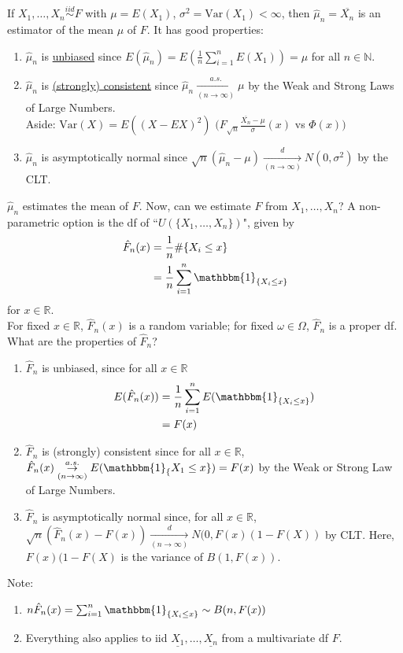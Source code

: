 \documentclass{article}
\newcommand{\R}{\mathbb{R}}
\newcommand{\N}{\mathbb{N}}
\newcommand{\Var}{\mathrm{Var}}
\begin{document}
			If $X_1, \dots, X_n\stackrel{iid}{\sim}F$ with $\mu=E(X_1)$, $\sigma^2=\Var(X_1)<\infty$, then $\hat{\mu}_n=\overline{X_n}$ is an estimator of the mean $\mu$ of $F$. It has good properties:
			
			\begin{enumerate}[label=(\roman*)]
				\item $\hat{\mu}_n$ is \ul{unbiased} since $E(\hat{\mu}_n)=E(\frac{1}{n}\sum_{i=1}^nE(X_1))=\mu$ for all $n\in\N$.
				
				\item $\hat{\mu}_n$ is \ul{(strongly) consistent} since $\hat{\mu}_n\underset{(n\to\infty)}{\overset{a.s.}{\to}}\mu$ by the Weak and Strong Laws of Large Numbers.\\
				
				Aside: $\Var(X)=E((X-EX)^2)$ $(F_{\sqrt{n}}\frac{\overline{X_n}-\mu}{\sigma}(x)$ vs $\Phi(x))$
				
				\item $\hat{\mu}_n$ is asymptotically normal since $\sqrt{n}(\hat{\mu}_n-\mu)\underset{(n\to\infty)}{\overset{d}{\to}}N(0, \sigma^2)$ by the CLT.
			\end{enumerate}
			
			$\hat{\mu}_n$ estimates the mean of $F$. Now, can we estimate $F$ from $X_1, \dots, X_n$? A non-parametric option is the df of ``$U(\{X_1, \dots, X_n\})$", given by
			\begin{align*}
				\hat{F}_n(x)&=\frac{1}{n}\#\{X_i\leq x\}\\
				&=\frac{1}{n}\sum_{i=1}^n\mathbbm{1}_{\{X_i\leq x\}}
			\end{align*}
			for $x\in\R$.\\
			
			For fixed $x\in\R$, $\hat{F}_n(x)$ is a random variable; for fixed $\omega\in\Omega$, $\hat{F}_n$ is a proper df.\\
			
			What are the properties of $\hat{F}_n$?
			\begin{enumerate}[label=(\roman*)]
				\item $\hat{F}_n$ is unbiased, since for all $x\in\R$
				\begin{align*}
					E(\hat{F}_n(x))&=\frac{1}{n}\sum_{i=1}^nE(\mathbbm{1}_{\{X_i\leq x\}})\\
					&=F(x)
				\end{align*}
				
				\item $\hat{F}_n$ is (strongly) consistent since for all $x\in\R$, $\hat{F}_n(x)\underset{(n\to\infty)}{\overset{a.s.}{\to}}E(\mathbbm{1}_\{{X_1\leq x\}})=F(x)$ by the Weak or Strong Law of Large Numbers.
				
				\item $\hat{F}_n$ is asymptotically normal since, for all $x\in\R$, $\sqrt{n}(\hat{F}_n(x)-F(x))\underset{(n\to\infty)}{\overset{d}{\to}}N(0, F(x)(1-F(X))$ by CLT. Here, $F(x)(1-F(X)$ is the variance of $B(1, F(x))$.
			\end{enumerate}
			
			Note:
			\begin{enumerate}
				\item $n\hat{F}_n(x)=\sum_{i=1}^n\mathbbm{1}_{\{X_i\leq x\}}\sim B(n, F(x))$
				
				\item Everything also applies to iid $\underline{X_1}, \dots, \underline{X_n}$ from a multivariate df $F$.
			\end{enumerate}
\end{document}
